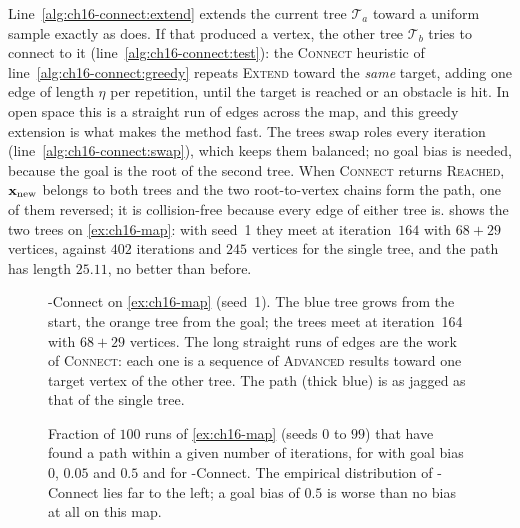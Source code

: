 Line~\ref{alg:ch16-connect:extend} extends the current tree $\mathcal{T}_a$ toward a
uniform sample exactly as \rrt does. If that produced a vertex, the other
tree $\mathcal{T}_b$ tries to connect to it (line~\ref{alg:ch16-connect:test}): the
\textsc{Connect} heuristic of
line~\ref{alg:ch16-connect:greedy} repeats \textsc{Extend} toward the
\emph{same} target, adding one edge of length $\eta$ per repetition, until
the target is reached or an obstacle is hit. In open space this is a straight
run of edges across the map, and this greedy extension is what makes the
method fast. The trees swap roles every iteration
(line~\ref{alg:ch16-connect:swap}), which keeps them balanced; no goal bias
is needed, because the goal is the root of the second tree. When
\textsc{Connect} returns \textsc{Reached}, $\mathbf{x}_{\mathrm{new}}$ belongs to both
trees and the two root-to-vertex chains form the path, one of them reversed;
it is collision-free because every edge of either tree is.
 shows the two trees on \cref{ex:ch16-map}: with
seed~1 they meet at iteration~$164$ with $68+29$ vertices, against $402$
iterations and $245$ vertices for the single tree, and the path has length
$25.11$, no better than before.

\begin{figure}[tb]
  \centering
  \caption{\rrt-Connect on \cref{ex:ch16-map} (seed~1). The blue tree grows
  from the start, the orange tree from the goal; the trees meet at
  iteration~164 with $68+29$ vertices. The long straight runs of edges are the
  work of \textsc{Connect}: each one is a sequence of \textsc{Advanced}
  results toward one target vertex of the other tree. The path (thick blue)
  is as jagged as that of the single tree.}
  \label{fig:ch16-connect}
\end{figure}

\begin{figure}[tb]
  \centering
  \caption{Fraction of $100$ runs of \cref{ex:ch16-map} (seeds $0$ to $99$)
  that have found a path within a given number of iterations, for \rrt with
  goal bias $0$, $0.05$ and $0.5$ and for \rrt-Connect. The empirical
  distribution of \rrt-Connect lies far to the left; a goal bias of $0.5$ is
  worse than no bias at all on this map.}
  \label{fig:ch16-iterations}
\end{figure}

